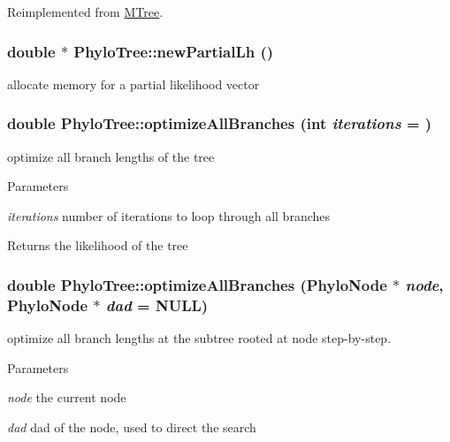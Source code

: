 Reimplemented from \hyperlink{classMTree_a5e9560ad6b544027bea362387eb2ec3f}{MTree}.\hypertarget{classPhyloTree_a3a0f7bf2fc3b545f1ccb6ad2dc8d887c}{
\subsubsection[{newPartialLh}]{\setlength{\rightskip}{0pt plus 5cm}double $\ast$ PhyloTree::newPartialLh ()}}
\label{classPhyloTree_a3a0f7bf2fc3b545f1ccb6ad2dc8d887c}
allocate memory for a partial likelihood vector \hypertarget{classPhyloTree_a0d95172300892b57830027c134d7e181}{
\subsubsection[{optimizeAllBranches}]{\setlength{\rightskip}{0pt plus 5cm}double PhyloTree::optimizeAllBranches (int {\em iterations} = {})}}
\label{classPhyloTree_a0d95172300892b57830027c134d7e181}
optimize all branch lengths of the tree 
\begin{DoxyParams}{Parameters}
\item[{\em iterations}]number of iterations to loop through all branches \end{DoxyParams}
\begin{DoxyReturn}{Returns}
the likelihood of the tree 
\end{DoxyReturn}
\hypertarget{classPhyloTree_ab256efc9eb59170ba486c9b6d6d684c7}{
\subsubsection[{optimizeAllBranches}]{\setlength{\rightskip}{0pt plus 5cm}double PhyloTree::optimizeAllBranches ({\bf PhyloNode} $\ast$ {\em node}, \/  {\bf PhyloNode} $\ast$ {\em dad} = {\ttfamily NULL})}}
\label{classPhyloTree_ab256efc9eb59170ba486c9b6d6d684c7}
optimize all branch lengths at the subtree rooted at node step-\/by-\/step. 
\begin{DoxyParams}{Parameters}
\item[{\em node}]the current node \item[{\em dad}]dad of the node, used to direct the search \end{DoxyParams}
